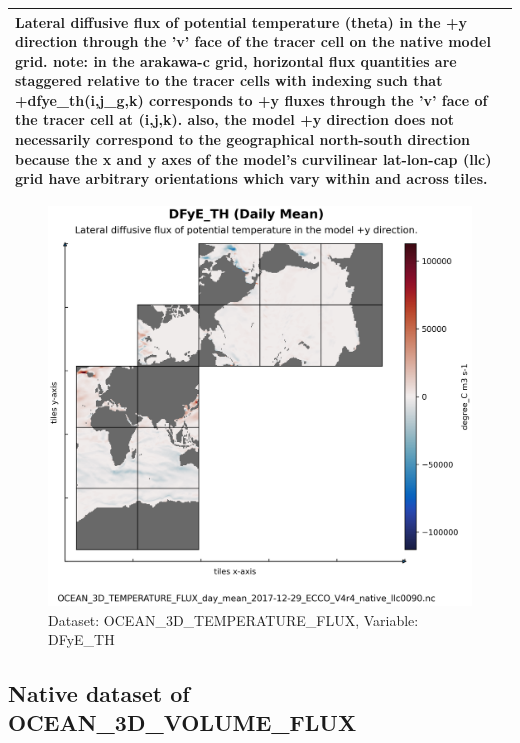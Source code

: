 \begin{longtable}{|m{}|m{}|m{}|m{}|}
\multicolumn{4}{|p{1\textwidth}|}{Lateral diffusive flux of potential temperature (theta) in the +y direction through the 'v' face of the tracer cell on the native model grid. note: in the arakawa-c grid, horizontal flux quantities are staggered relative to the tracer cells with indexing such that +dfye\_th(i,j\_g,k) corresponds to +y fluxes through the 'v' face of the tracer cell at (i,j,k). also, the model +y direction does not necessarily correspond to the geographical north-south direction because the x and y axes of the model's curvilinear lat-lon-cap (llc) grid have arbitrary orientations which vary within and across tiles.} \\ \hline
\end{longtable}

\begin{figure}[H]
\centering
\includegraphics[scale=0.55]{../images/plots/native_plots/Ocean_Three-Dimensional_Potential_Temperature_Fluxes/DFyE_TH.png}
\caption{Dataset: OCEAN\_3D\_TEMPERATURE\_FLUX, Variable: DFyE\_TH}
\label{tab:table-OCEAN_3D_TEMPERATURE_FLUX_DFyE_TH-Plot}
\end{figure}
\subsection{Native dataset of OCEAN\_3D\_VOLUME\_FLUX}
\newp
